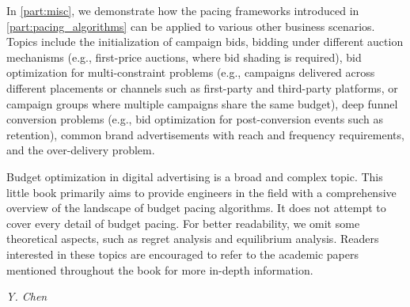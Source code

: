 \documentclass[../Main.tex]{subfiles}
\begin{document}
	 In \autoref{part:misc}, we demonstrate how the pacing frameworks introduced in \autoref{part:pacing_algorithms} can be applied to various other business scenarios. Topics include the initialization of campaign bids, bidding under different auction mechanisms (e.g., first-price auctions, where bid shading is required), bid optimization for multi-constraint problems (e.g., campaigns delivered across different placements or channels such as first-party and third-party platforms, or campaign groups where multiple campaigns share the same budget), deep funnel conversion problems (e.g., bid optimization for post-conversion events such as retention), common brand advertisements with reach and frequency requirements, and the over-delivery problem.
	 
	 Budget optimization in digital advertising is a broad and complex topic. This little book primarily aims to provide engineers in the field with a comprehensive overview of the landscape of budget pacing algorithms. It does not attempt to cover every detail of budget pacing. For better readability, we omit some theoretical aspects, such as regret analysis and equilibrium analysis. Readers interested in these topics are encouraged to refer to the academic papers mentioned throughout the book for more in-depth information.
	 
	 \begin{flushright}
	 	\textit{Y. Chen}
	 \end{flushright}
	 
	
	
\end{document}
